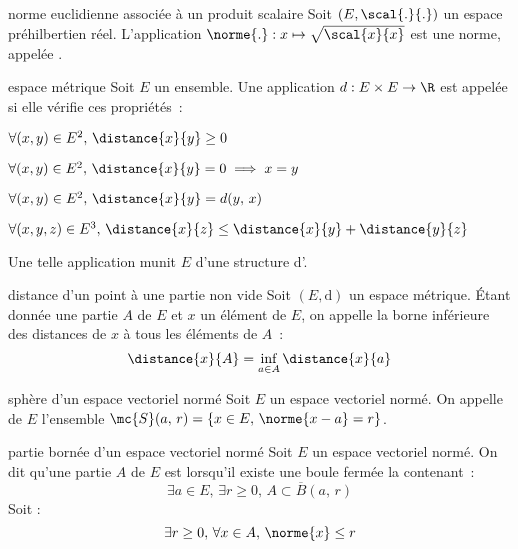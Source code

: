 \begin{adjustwidth}{-3cm}{-3cm}
\begin{theoreme}{3.7}{norme euclidienne associée à un produit scalaire}
    Soit $(E, \scal{.}{.})$ un espace préhilbertien réel. L'application $\norme{.}:x \mapsto \sqrt{\scal{x}{x}}$ est une norme, appelée .
\end{theoreme}

\begin{definition}{3.12}{espace métrique}
    Soit $E$ un ensemble. Une application $d : E \times E \to \R$ est appelée  si elle vérifie ces propriétés~:
    \begin{enumeratebf}
        \item $\forall (x,y) \in E^2,\, \distance{x}{y} \geq 0$
        \item $\forall (x,y) \in E^2,\, \distance{x}{y} = 0 \implies x = y$
        \item $\forall (x,y) \in E^2,\, \distance{x}{y} = d(y,\,x)$
        \item $\forall (x,y,z) \in E^3,\, \distance{x}{z} \leq \distance{x}{y} + \distance{y}{z}$
    \end{enumeratebf}
    Une telle application munit $E$ d'une structure d'. 
\end{definition}

\begin{definition}{3.14}{distance d'un point à une partie non vide}
    Soit $(E, \text{d})$ un espace métrique. Étant donnée une partie $A$ de $E$ et $x$ un élément de $E$, on appelle  la borne inférieure des distances de $x$ à tous les éléments de $A$~:
    $$\distance{x}{A} = \inf_{a \in A} \distance{x}{a}$$
\end{definition}

\begin{definition}{3.15}{sphère d'un espace vectoriel normé}
    Soit $E$ un espace vectoriel normé. On appelle  de $E$ l’ensemble $\mc{S}(a,\, r) = \{ x \in E,\, \norme{x - a} = r\}$.
\end{definition}

\begin{definition}{3.16}{partie bornée d'un espace vectoriel normé}
    Soit $E$ un espace vectoriel normé. On dit qu'une partie $A$ de $E$ est  lorsqu'il existe une boule fermée la contenant~: 
    $$\exists a \in E,\, \exists r \geq 0,\, A \subset \overline{B}(a,\, r)$$
    Soit : 
    $$\exists r \geq 0,\, \forall x \in A,\, \norme{x} \leq r$$
\end{definition}


\end{adjustwidth}
